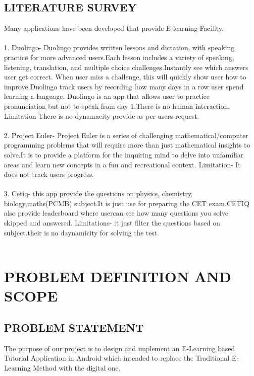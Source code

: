 \documentclass[oneside,a4paper,12pt]{report}
\begin{document}
{\section{LITERATURE SURVEY}
\hspace*{0.3in}Many applications have been developed that provide E-learning Facility.
\\
\\
1. Duolingo- Duolingo provides written lessons and dictation, with speaking
practice for more advanced users.Each lesson includes a variety of speaking,
listening, translation, and multiple choice challenges.Instantly see which answers
user get correct. When user miss a challenge, this will quickly show user
how to improve.Duolingo track users by recording how many days in a row
user spend learning a language. Duolingo is an app that allows user to practice
pronunciation but not to speak from day 1.There is no human interaction.
Limitation-There is no dynamacity provide as per users request.
\\
\\
2. Project Euler- Project Euler is a series of challenging mathematical/computer
programming problems that will require more than just mathematical insights
to solve.It is to provide a platform for the inquiring mind to delve into unfamiliar
areas and learn new concepts in a fun and recreational context. Limitation-
It does not track users progress.
\\
\\
3. Cetiq- this app provide the questions on physics, chemistry, biology,maths(PCMB)
subject.It is just use for preparing the CET exam.CETIQ also provide leaderboard
where usercan see how many questions you solve skipped and answered.
Limitations- it just filter the questions based on subject.their is no daynamicity
for solving the test.
\\
\\


\chapter{PROBLEM DEFINITION AND SCOPE}
\newpage
\section{PROBLEM STATEMENT}
\hspace*{0.3in}The purpose of our project is to design and implement an E-Learning based Tutorial
Application in Android which intended to replace the Traditional E- Learning
Method with the digital one.\\

}
\end{document}
